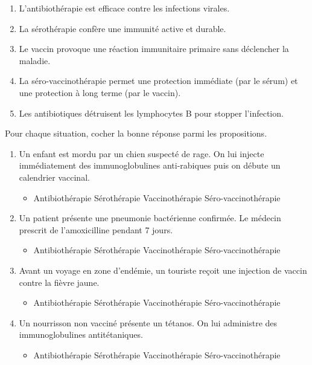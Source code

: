 \documentclass[11pt]{article}
\begin{document}
\begin{exercice}
\begin{enumerate}
    \item L'antibiothérapie est efficace contre les infections virales.
    \item La sérothérapie confère une immunité active et durable.
    \item Le vaccin provoque une réaction immunitaire primaire sans déclencher la maladie.
    \item La séro-vaccinothérapie permet une protection immédiate (par le sérum) et une protection à long terme (par le vaccin).
    \item Les antibiotiques détruisent les lymphocytes B pour stopper l'infection.
\end{enumerate}
\end{exercice}

\begin{exercice}
Pour chaque situation, cocher la bonne réponse parmi les propositions.
\begin{enumerate}
    \item Un enfant est mordu par un chien suspecté de rage. On lui injecte immédiatement des immunoglobulines anti-rabiques puis on débute un calendrier vaccinal.
    \begin{itemize}
        \item[A.] Antibiothérapie \quad [B.] Sérothérapie \quad [C.] Vaccinothérapie \quad [D.] Séro-vaccinothérapie
    \end{itemize}
    \item Un patient présente une pneumonie bactérienne confirmée. Le médecin prescrit de l'amoxicilline pendant 7 jours.
    \begin{itemize}
        \item[A.] Antibiothérapie \quad [B.] Sérothérapie \quad [C.] Vaccinothérapie \quad [D.] Séro-vaccinothérapie
    \end{itemize}
    \item Avant un voyage en zone d'endémie, un touriste reçoit une injection de vaccin contre la fièvre jaune.
    \begin{itemize}
        \item[A.] Antibiothérapie \quad [B.] Sérothérapie \quad [C.] Vaccinothérapie \quad [D.] Séro-vaccinothérapie
    \end{itemize}
    \item Un nourrisson non vacciné présente un tétanos. On lui administre des immunoglobulines antitétaniques.
    \begin{itemize}
        \item[A.] Antibiothérapie \quad [B.] Sérothérapie \quad [C.] Vaccinothérapie \quad [D.] Séro-vaccinothérapie
    \end{itemize}
\end{enumerate}
\end{exercice}
\end{document}

